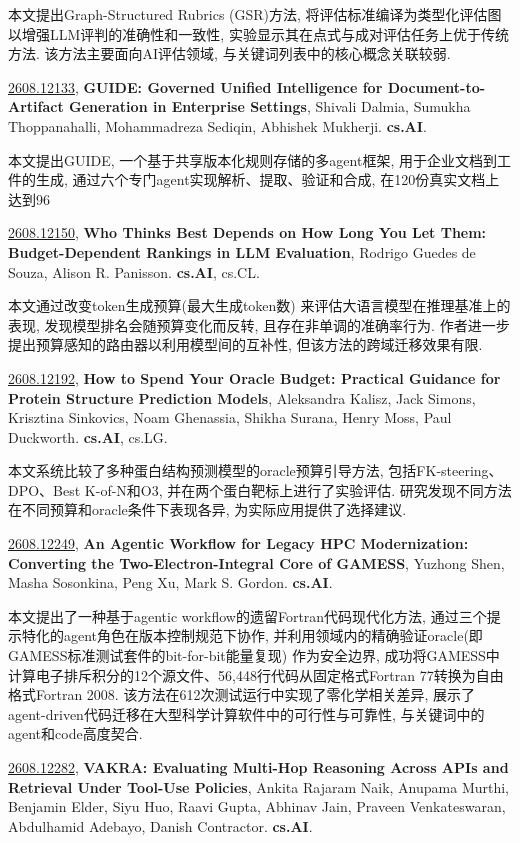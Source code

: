 \documentclass[9pt, a4paper]{article}
\theoremstyle{plain}
\theoremstyle{definition}
\theoremstyle{remark}
\newcommand{\arxivwithtarget}[3]{\hypertarget{#1}{}\href{https://arxiv.org/abs/#1}{#1}, \textbf{\textcolor{arxivblue}{#2}}, #3. }
\begin{document}
本文提出Graph-Structured Rubrics (GSR)方法, 将评估标准编译为类型化评估图以增强LLM评判的准确性和一致性, 实验显示其在点式与成对评估任务上优于传统方法. 该方法主要面向AI评估领域, 与关键词列表中的核心概念关联较弱.


\arxivwithtarget{2608.12133}{GUIDE: Governed Unified Intelligence for Document-to-Artifact Generation in Enterprise Settings}{Shivali Dalmia, Sumukha Thoppanahalli, Mohammadreza Sediqin, Abhishek Mukherji}\textbf{cs.AI}.

本文提出GUIDE, 一个基于共享版本化规则存储的多agent框架, 用于企业文档到工件的生成, 通过六个专门agent实现解析、提取、验证和合成, 在120份真实文档上达到96%


\arxivwithtarget{2608.12150}{Who Thinks Best Depends on How Long You Let Them: Budget-Dependent Rankings in LLM Evaluation}{Rodrigo Guedes de Souza, Alison R. Panisson}\textbf{cs.AI}, cs.CL.

本文通过改变token生成预算(最大生成token数) 来评估大语言模型在推理基准上的表现, 发现模型排名会随预算变化而反转, 且存在非单调的准确率行为. 作者进一步提出预算感知的路由器以利用模型间的互补性, 但该方法的跨域迁移效果有限.


\arxivwithtarget{2608.12192}{How to Spend Your Oracle Budget: Practical Guidance for Protein Structure Prediction Models}{Aleksandra Kalisz, Jack Simons, Krisztina Sinkovics, Noam Ghenassia, Shikha Surana, Henry Moss, Paul Duckworth}\textbf{cs.AI}, cs.LG.

本文系统比较了多种蛋白结构预测模型的oracle预算引导方法, 包括FK-steering、DPO、Best K-of-N和O3, 并在两个蛋白靶标上进行了实验评估. 研究发现不同方法在不同预算和oracle条件下表现各异, 为实际应用提供了选择建议.


\arxivwithtarget{2608.12249}{An Agentic Workflow for Legacy HPC Modernization: Converting the Two-Electron-Integral Core of GAMESS}{Yuzhong Shen, Masha Sosonkina, Peng Xu, Mark S. Gordon}\textbf{cs.AI}.

本文提出了一种基于agentic workflow的遗留Fortran代码现代化方法, 通过三个提示特化的agent角色在版本控制规范下协作, 并利用领域内的精确验证oracle(即GAMESS标准测试套件的bit-for-bit能量复现) 作为安全边界, 成功将GAMESS中计算电子排斥积分的12个源文件、56,448行代码从固定格式Fortran 77转换为自由格式Fortran 2008. 该方法在612次测试运行中实现了零化学相关差异, 展示了agent-driven代码迁移在大型科学计算软件中的可行性与可靠性, 与关键词中的agent和code高度契合.


\arxivwithtarget{2608.12282}{VAKRA: Evaluating Multi-Hop Reasoning Across APIs and Retrieval Under Tool-Use Policies}{Ankita Rajaram Naik, Anupama Murthi, Benjamin Elder, Siyu Huo, Raavi Gupta, Abhinav Jain, Praveen Venkateswaran, Abdulhamid Adebayo, Danish Contractor}\textbf{cs.AI}.
\end{document}
